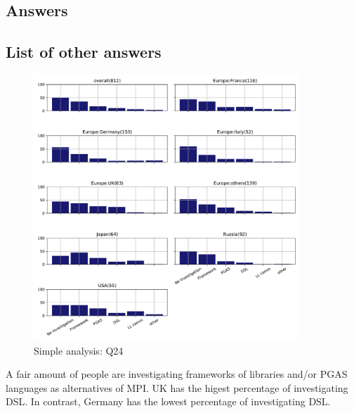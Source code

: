 
\subsection{Answers}


\subsection{List of other answers}
\begin{itemize}

\end{itemize}

\begin{figure}[htb]
\begin{center}
\includegraphics[width=10cm]{../pdfs/Q24.pdf}
\caption{Simple analysis: Q24}
\label{fig:Q24}
\end{center}
\end{figure}

A fair amount of people are investigating frameworks of libraries
and/or PGAS languages as alternatives of MPI.  UK has the higest
percentage of investigating DSL. In contrast, Germany has the lowest
percentage of investigating DSL. 
